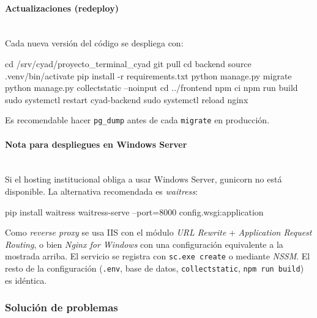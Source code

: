 \paragraph{Actualizaciones (redeploy)}\mbox{}\\
Cada nueva versión del código se despliega con:

\begin{Comandos}
cd /srv/cyad/proyecto_terminal_cyad
git pull
cd backend
source .venv/bin/activate
pip install -r requirements.txt
python manage.py migrate
python manage.py collectstatic --noinput
cd ../frontend
npm ci
npm run build
sudo systemctl restart cyad-backend
sudo systemctl reload nginx
\end{Comandos}

Es recomendable hacer \texttt{pg\_dump} antes de cada \texttt{migrate} en producción.

\paragraph{Nota para despliegues en Windows Server}\mbox{}\\
Si el hosting institucional obliga a usar Windows Server, gunicorn no está disponible. La alternativa recomendada es \emph{waitress}:

\begin{Comandos}
pip install waitress
waitress-serve --port=8000 config.wsgi:application
\end{Comandos}

Como \emph{reverse proxy} se usa IIS con el módulo \emph{URL Rewrite} + \emph{Application Request Routing}, o bien \emph{Nginx for Windows} con una configuración equivalente a la mostrada arriba. El servicio se registra con \texttt{sc.exe create} o mediante \emph{NSSM}. El resto de la configuración (\texttt{.env}, base de datos, \texttt{collectstatic}, \texttt{npm run build}) es idéntica.

\subsubsection{Solución de problemas}

